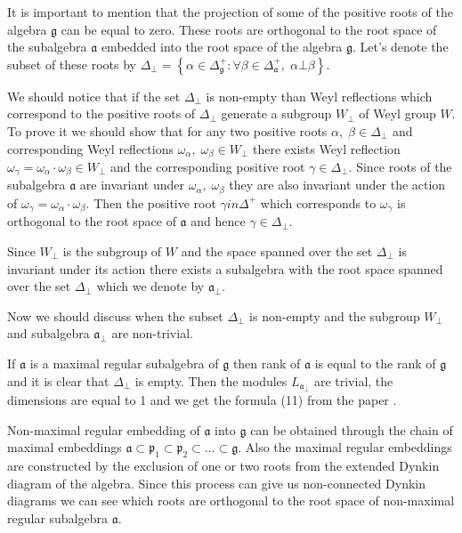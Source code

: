 \documentclass[a4paper,12pt]{article}
\theoremstyle{definition} \newtheorem{Def}{Definition}
\begin{document}
It is important to mention that the projection of some of the positive roots of the algebra $\mathfrak{g}$ can be equal to zero. These roots are orthogonal to the root space of the subalgebra $\mathfrak{a}$ embedded into the root space of the algebra $\mathfrak{g}$. Let's denote the subset of these roots by $\Delta_{\bot}=\left\{\alpha\in\Delta_{\mathfrak{g}}^{+}:\forall \beta\in \Delta_{\mathfrak{a}}^{+},\; \alpha\bot\beta \right\}$.

We should notice that if the set $\Delta_{\bot}$ is non-empty than Weyl reflections which correspond to the positive roots of $\Delta_{\bot}$ generate a subgroup $W_{\bot}$ of Weyl group $W$. To prove it we should show that for any two positive roots $\alpha,\; \beta\in \Delta_{\bot}$ and corresponding Weyl reflections $\omega_{\alpha},\; \omega_{\beta}\in W_{\bot}$ there exists Weyl reflection $\omega_{\gamma}=\omega_{\alpha}\cdot \omega_{\beta}\in W_{\bot}$ and the corresponding positive root $\gamma\in \Delta_{\bot}$. Since roots of the subalgebra $\mathfrak{a}$ are invariant under $\omega_{\alpha}, \; \omega_{\beta}$ they are also invariant under the action of $\omega_{\gamma}=\omega_{\alpha}\cdot \omega_{\beta}$. Then the positive root $\gamma in \Delta^{+}$ which corresponds to $\omega_{\gamma}$ is orthogonal to the root space of $\mathfrak{a}$ and hence $\gamma\in \Delta_{\bot}$. 

Since $W_{\bot}$ is the subgroup of $W$ and the space spanned over the set $\Delta_{\bot}$ is invariant under its action there exists a  subalgebra with the root space spanned over the set $\Delta_{\bot}$ which we denote by $\mathfrak{a}_{\bot}$.

Now we should discuss when the subset $\Delta_{\bot}$ is non-empty and the subgroup $W_{\bot}$ and subalgebra $\mathfrak{a}_{\bot}$ are non-trivial.

If $\mathfrak{a}$ is a maximal regular subalgebra of $\mathfrak{g}$ then rank of $\mathfrak{a}$ is equal to the rank of $\mathfrak{g}$ and it is clear that $\Delta_{\bot}$ is empty.
Then the modules $L_{\mathfrak{a}_{\bot}}$ are trivial, the dimensions are equal to 1 and we get the formula (11) from the paper \cite{ilyin812pbc}.

Non-maximal regular embedding of $\mathfrak{a}$ into $\mathfrak{g}$ can be obtained through the chain of maximal embeddings $\mathfrak{a}\subset \mathfrak{p}_1\subset \mathfrak{p}_2\subset\dots \subset \mathfrak{g}$. Also the maximal regular embeddings are constructed by the exclusion of one or two roots from the extended Dynkin diagram of the algebra. Since this process can give us non-connected Dynkin diagrams we can see which roots are orthogonal to the root space of non-maximal regular subalgebra $\mathfrak{a}$. 
\end{document}
